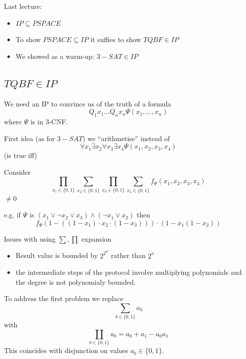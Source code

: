 \documentclass[a4paper,12pt]{article}
\theoremstyle{definition}
\theoremstyle{remark}
\begin{document}
Last lecture:
\begin{itemize}
    \item $IP \subseteq PSPACE$
    \item To show $PSPACE \subseteq IP$ it suffies to show $TQBF \in IP$
    \item We showed as a warm-up: $3-SAT \in IP$
\end{itemize}

\subsection{$TQBF \in IP$}
We need an IP to convince us of the truth of a formula
\begin{equation*}
    Q_1 x_1 \dots Q_n x_n \Psi (x_1, \dots, x_n)
\end{equation*}
where $\Psi$ is in 3-CNF.

First idea (as for $3-SAT$) we ``arithmetise'' instead of 
\begin{equation*}
    \forall x_1 \exists x_2 \forall x_3 \exists x_4 \Psi (x_1, x_2, x_3, x_4)
\end{equation*}
(is true iff)

Consider
\begin{equation*}
    \prod_{x_1 \in \{0, 1\}} \sum_{x_2 \in \{0, 1\}} \prod_{x_3 \in \{0, 1\}} \sum_{x_4 \in \{0, 1\}} f_\Psi (x_1, x_2, x_3, x_4)
\end{equation*}
$ \neq 0$

e.g. if $\Psi$ is $(x_1 \lor \neg x_2 \lor x_3) \land (\neg x_1 \lor x_2)$ then
\begin{equation*}
    f_\Psi (1 - ((1 - x_1) \cdot x_2 \cdot (1 - x_3))) \cdot (1 - x_1 (1 - x_2))
\end{equation*}

Issues with using $\sum, \prod$ expansion
\begin{itemize}
    \item Result value is bounded by $2^{2^n}$ rather than $2^n$
    \item the intermediate steps of the protocol involve multiplying polynomials and the degree is not polynomialy bounded.
\end{itemize}

To address the first problem we replace 
\begin{equation*}
    \sum_{b \in \{0, 1\}} a_b
\end{equation*}
with
\begin{equation*}
   \coprod_{b \in \{0, 1\}} a_b = a_0 + a_1 - a_0 a_1 %
\end{equation*}
This coincides with disjunction on values $a_b \in \{0, 1\}$.
\end{document}
